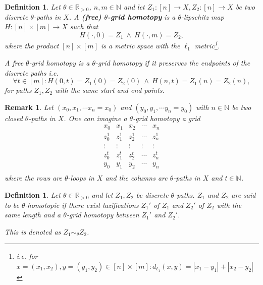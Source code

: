 \documentclass[a4paper, 11pt, twoside]{article}
\newcommand{\R}[0]{\mathbb{R}}
\newcommand{\N}[0]{\mathbb{N}}
\theoremstyle{break}
\theoremstyle{break}
\newtheorem{defin}[thm]{Definition}
\newtheorem{rem}[thm]{Remark}
\begin{document}
\begin{defin}
  Let $\theta \in \R_{>0}$, $n,m \in \N$ and let $Z_1\colon [n] \to X, Z_2: [n] \to X$ be two discrete $\theta$-paths in $X$. 
  A \textbf{(free) $\theta$-grid homotopy} is a $\theta$-lipschitz map $H\colon [n] \times [m] \to X$ such that
  \begin{equation*}
    H(\cdot, 0) = Z_1 \: \land \: H(\cdot, m) = Z_2,
  \end{equation*}
  where the product $[n] \times [m]$ is a metric space with the $\ell_1$ metric\footnote{i.e. for $x = (x_1, x_2), y = (y_1, y_2) \in [n] \times [m]\colon d_{\ell_1}(x, y) = |x_1 - y_1| + |x_2 - y_2|$}.

  A free $\theta$-grid homotopy is a $\theta$-grid homotopy if it preserves the endpoints of the discrete paths i.e.
  \begin{equation*}
    \forall t\in [m]\colon H(0,t) = Z_1(0) = Z_2(0) \: \land \: H(n,t) = Z_1(n) = Z_2(n),
  \end{equation*}
  for paths $Z_1, Z_2$ with the same start and end points.

  \cite[p. 3]{vigolo2018fundamental}
\end{defin}

\begin{rem}
  Let $(x_0, x_1, \cdots x_n = x_0)$ and $(y_0, y_1, \cdots y_n = y_0)$ with $n \in \N$ be two closed $\theta$-paths in $X$. 
  One can imagine a $\theta$-grid homotopy a grid
  \begin{equation*}
    \begin{matrix}
      x_0 & x_1 & x_2 & \cdots & x_n \\
      z_0^1 & z_1^1 & z_2^1 & \cdots & z_n^1 \\
      \vdots & \vdots & \vdots & \vdots & \vdots \\
      z_0^{t} & z_1^{t} & z_2^{t} & \cdots & z_n^{t} \\
      y_0 & y_1 & y_2 & \cdots & y_n \\
    \end{matrix}
  \end{equation*}
  where the rows are $\theta$-loops in $X$ and the columns are $\theta$-paths in $X$ and $t\in \N$.

  \cite[p. 3, Def. 2.2]{barcelo2014discrete}
\end{rem}

\begin{defin}
  Let $\theta \in \R_{>0}$ and let $Z_1, Z_2$ be discrete $\theta$-paths. $Z_1$ and $Z_2$ are said to be $\theta$-homotopic 
  if there exist lazifications $Z_1'$ of $Z_1$ and $Z_2'$ of $Z_2$ with the same length and a $\theta$-grid homotopy between $Z_1'$ and $Z_2'$.
  
  This is denoted as $Z_1 \sim_{\theta} Z_2$.

  \cite[p. 3, Def. 2.2]{vigolo2018fundamental}
\end{defin}
\end{document}
